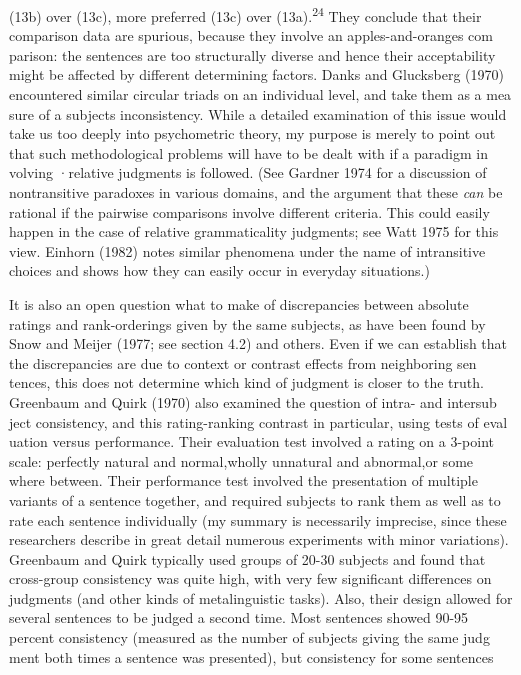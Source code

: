 \begin{styleTextbody}
(13b) over (13c), more preferred (13c) over (13a).\textsuperscript{24}\textsuperscript{ }They conclude that their comparison data are spurious, because they involve an apples-and-oranges com\- parison: the sentences are too structurally diverse and hence their acceptability might be affected by different determining factors. Danks and Glucksberg (1970) encountered similar circular triads on an individual level, and take them as a mea\- sure of a subject{\textquotesingle}s inconsistency. While a detailed examination of this issue would take us too deeply into psychometric theory, my purpose is merely to point out that such methodological problems will have to be dealt with if a paradigm in\- volving ·relative judgments is followed. (See Gardner 1974 for a discussion of nontransitive paradoxes in various domains, and the argument that these \textit{can}\textit{ }be rational if the pairwise comparisons involve different criteria. This could easily happen in the case of relative grammaticality judgments; see Watt 1975 for this view. Einhorn (1982) notes similar phenomena under the name of {\textquotedbl}intransitive choices{\textquotedbl} and shows how they can easily occur in everyday situations.)
\end{styleTextbody}


\begin{styleTextbody}
It is also an open question what to make of discrepancies between absolute ratings and rank-orderings given by the same subjects, as have been found by Snow and Meijer (1977; see section 4.2) and others. Even if we can establish that the discrepancies are due to context or contrast effects from neighboring sen\- tences, this does not determine which kind of judgment is closer to the truth. Greenbaum and Quirk (1970) also examined the question of intra- and intersub\- ject consistency, and this rating-ranking contrast in particular, using tests of eval\- uation versus performance. Their evaluation test involved a rating on a 3-point scale: {\textquotedbl}perfectly natural and normal,{\textquotedbl}{\textquotedbl}wholly unnatural and abnormal,{\textquotedbl}or {\textquotedbl}some\- where between.{\textquotedbl} Their performance test involved the presentation of multiple variants of a sentence together, and required subjects to rank them as well as to rate each sentence individually (my summary is necessarily imprecise, since these researchers describe in great detail numerous experiments with minor variations). Greenbaum and Quirk typically used groups of 20-30 subjects and found that cross-group consistency was quite high, with very few significant differences on judgments (and other kinds of metalinguistic tasks). Also, their design allowed for several sentences to be judged a second time. Most sentences showed 90-95 percent consistency (measured as the number of subjects giving the same judg\- ment both times a sentence was presented), but consistency for some sentences{\textquotesingle}
\end{styleTextbody}


